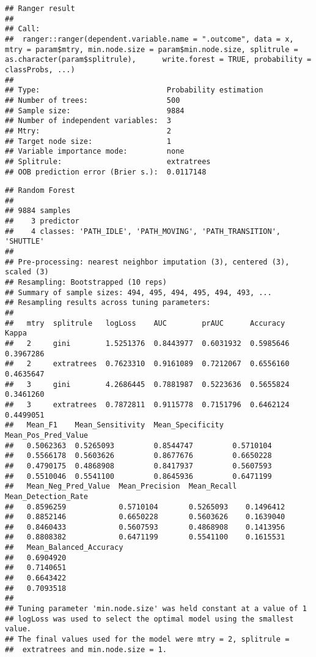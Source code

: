 \documentclass[]{article}
\begin{document}
\begin{verbatim}
## Ranger result
## 
## Call:
##  ranger::ranger(dependent.variable.name = ".outcome", data = x,      mtry = param$mtry, min.node.size = param$min.node.size, splitrule = as.character(param$splitrule),      write.forest = TRUE, probability = classProbs, ...) 
## 
## Type:                             Probability estimation 
## Number of trees:                  500 
## Sample size:                      9884 
## Number of independent variables:  3 
## Mtry:                             2 
## Target node size:                 1 
## Variable importance mode:         none 
## Splitrule:                        extratrees 
## OOB prediction error (Brier s.):  0.0117148
\end{verbatim}

\begin{verbatim}
## Random Forest 
## 
## 9884 samples
##    3 predictor
##    4 classes: 'PATH_IDLE', 'PATH_MOVING', 'PATH_TRANSITION', 'SHUTTLE' 
## 
## Pre-processing: nearest neighbor imputation (3), centered (3), scaled (3) 
## Resampling: Bootstrapped (10 reps) 
## Summary of sample sizes: 494, 495, 494, 495, 494, 493, ... 
## Resampling results across tuning parameters:
## 
##   mtry  splitrule   logLoss    AUC        prAUC      Accuracy   Kappa    
##   2     gini        1.5251376  0.8443977  0.6031932  0.5985646  0.3967286
##   2     extratrees  0.7623310  0.9161089  0.7212067  0.6556160  0.4635647
##   3     gini        4.2686445  0.7881987  0.5223636  0.5655824  0.3461260
##   3     extratrees  0.7872811  0.9115778  0.7151796  0.6462124  0.4499051
##   Mean_F1    Mean_Sensitivity  Mean_Specificity  Mean_Pos_Pred_Value
##   0.5062363  0.5265093         0.8544747         0.5710104          
##   0.5566178  0.5603626         0.8677676         0.6650228          
##   0.4790175  0.4868908         0.8417937         0.5607593          
##   0.5510046  0.5541100         0.8645936         0.6471199          
##   Mean_Neg_Pred_Value  Mean_Precision  Mean_Recall  Mean_Detection_Rate
##   0.8596259            0.5710104       0.5265093    0.1496412          
##   0.8852146            0.6650228       0.5603626    0.1639040          
##   0.8460433            0.5607593       0.4868908    0.1413956          
##   0.8808382            0.6471199       0.5541100    0.1615531          
##   Mean_Balanced_Accuracy
##   0.6904920             
##   0.7140651             
##   0.6643422             
##   0.7093518             
## 
## Tuning parameter 'min.node.size' was held constant at a value of 1
## logLoss was used to select the optimal model using the smallest value.
## The final values used for the model were mtry = 2, splitrule =
##  extratrees and min.node.size = 1.
\end{verbatim}
\end{document}
